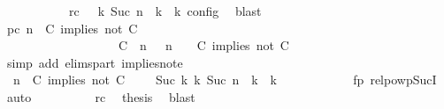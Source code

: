 \begin{isabellebody}
\ \ \ \ \ \ \ \ \ \ \ rc{\isacharcolon}{\isacartoucheopen}{\isasymrho}\ {\isasymin}\ {\isasymlbrakk}\ {\isasymGamma}\isactrlsub k{\isacharcomma}\ Suc\ n\ {\isasymturnstile}\ {\isasymPsi}\isactrlsub k\ {\isasymtriangleright}\ {\isasymPhi}\isactrlsub k\ {\isasymrbrakk}\isactrlsub c\isactrlsub o\isactrlsub n\isactrlsub f\isactrlsub i\isactrlsub g{\isacartoucheclose}\ \isamarkupfalse%
\ blast\isanewline
\ \ \ \ \ \ \ \ \isamarkupfalse%
\ pc{\isacharcolon}{\isacartoucheopen}{\isacharparenleft}{\isasymGamma}{\isacharcomma}\ n\ {\isasymturnstile}\ {\isacharparenleft}C\ implies\ not\ C\ {\isacharhash}\ {\isasymPsi}\ {\isasymtriangleright}\ {\isasymPhi}{\isacharparenright}\isanewline
\ \ \ \ \ \ \ \ \ \ \ \ \ \ \ \ \ \ {\isasymhookrightarrow}\ {\isacharparenleft}{\isacharparenleft}{\isacharparenleft}C\ {\isasymnot}{\isasymUp}\ n{\isacharparenright}\ {\isacharhash}\ {\isasymGamma}{\isacharparenright}{\isacharcomma}\ n\ {\isasymturnstile}\ {\isasymPsi}\ {\isasymtriangleright}\ {\isacharparenleft}{\isacharparenleft}C\ implies\ not\ C\ {\isacharhash}\ {\isasymPhi}{\isacharparenright}{\isacharparenright}{\isacartoucheclose}\isanewline
\ \ \ \ \ \ \ \ \ \ \isamarkupfalse%
\ {\isacharparenleft}simp\ add{\isacharcolon}\ elims{\isacharunderscore}part\ implies{\isacharunderscore}not{\isacharunderscore}e{}{\isacharparenright}\isanewline
\ \ \ \ \ \ \ \ \isamarkupfalse%
\ {\isacartoucheopen}{\isacharparenleft}{\isasymGamma}{\isacharcomma}\ n\ {\isasymturnstile}\ {\isacharparenleft}C\ implies\ not\ C\ {\isacharhash}\ {\isasymPsi}\ {\isasymtriangleright}\ {\isasymPhi}{\isacharparenright}\ {\isasymhookrightarrow}\isactrlbsup Suc\ k\isactrlesup \ {\isacharparenleft}{\isasymGamma}\isactrlsub k{\isacharcomma}\ Suc\ n\ {\isasymturnstile}\ {\isasymPsi}\isactrlsub k\ {\isasymtriangleright}\ {\isasymPhi}\isactrlsub k{\isacharparenright}{\isacartoucheclose}\isanewline
\ \ \ \ \ \ \ \ \ \ \isamarkupfalse%
\ fp\ relpowp{\isacharunderscore}Suc{\isacharunderscore}I{}\ \isamarkupfalse%
\ auto\isanewline
\ \ \ \ \ \ \ \ \isamarkupfalse%
\ rc\ \isamarkupfalse%
\ {\isacharquery}thesis\ \isamarkupfalse%
\ blast\isanewline
\ \ \ \ \ \ \isamarkupfalse%
\isanewline

\end{isabellebody}

